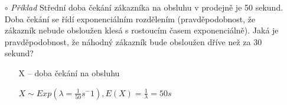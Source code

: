 \begin{itemize}
\begin{itemize}
\begin{figure}[H]
	\end{figure}
	\item[$\circ$] \textit{Příklad} Střední doba čekání zákazníka na obsluhu v prodejně je 50 sekund. Doba čekání se řídí exponenciálním rozdělením (pravděpodobnost, že zákazník nebude obsloužen klesá s rostoucím časem exponenciálně). Jaká je pravděpodobnost, že náhodný zákazník bude obsloužen dříve než za 30 sekund?
	\begin{itemize}
		\item[] X -- doba čekání na obsluhu
		\item[] $X \sim Exp (\lambda = \frac{1}{50}s^-1), E(X) = \frac{1}{\lambda} = 50 s$
	\end{itemize}
\end{itemize}
\end{itemize}

